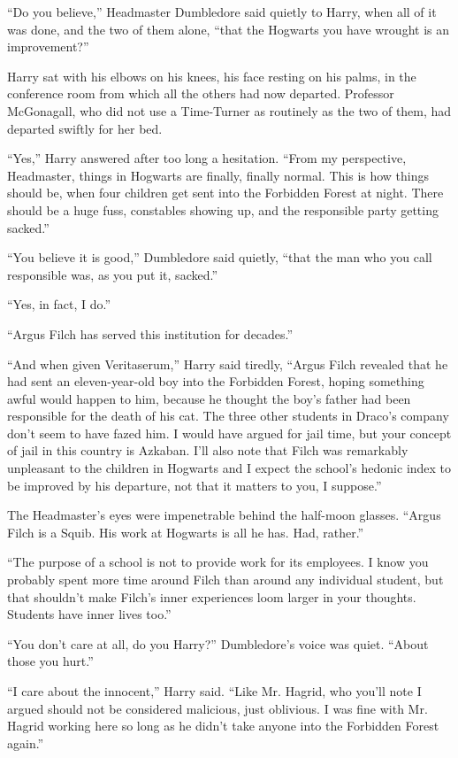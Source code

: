 ``Do you believe,'' Headmaster Dumbledore said quietly to Harry, when all of it was done, and the two of them alone, ``that the Hogwarts you have wrought is an improvement?''

Harry sat with his elbows on his knees, his face resting on his palms, in the conference room from which all the others had now departed. Professor McGonagall, who did not use a Time-Turner as routinely as the two of them, had departed swiftly for her bed.

``Yes,'' Harry answered after too long a hesitation. ``From my perspective, Headmaster, things in Hogwarts are finally, finally normal. This is how things should be, when four children get sent into the Forbidden Forest at night. There should be a huge fuss, constables showing up, and the responsible party getting sacked.''

``You believe it is good,'' Dumbledore said quietly, ``that the man who you call responsible was, as you put it, sacked.''

``Yes, in fact, I do.''

``Argus Filch has served this institution for decades.''

``And when given Veritaserum,'' Harry said tiredly, ``Argus Filch revealed that he had sent an eleven-year-old boy into the Forbidden Forest, hoping something awful would happen to him, because he thought the boy's father had been responsible for the death of his cat. The three other students in Draco's company don't seem to have fazed him. I would have argued for jail time, but your concept of jail in this country is Azkaban. I'll also note that Filch was remarkably unpleasant to the children in Hogwarts and I expect the school's hedonic index to be improved by his departure, not that it matters to you, I suppose.''

The Headmaster's eyes were impenetrable behind the half-moon glasses. ``Argus Filch is a Squib. His work at Hogwarts is all he has. Had, rather.''

``The purpose of a school is not to provide work for its employees. I know you probably spent more time around Filch than around any individual student, but that shouldn't make Filch's inner experiences loom larger in your thoughts. Students have inner lives too.''

``You don't care at all, do you Harry?'' Dumbledore's voice was quiet. ``About those you hurt.''

``I care about the innocent,'' Harry said. ``Like Mr. Hagrid, who you'll note I argued should not be considered malicious, just oblivious. I was fine with Mr. Hagrid working here so long as he didn't take anyone into the Forbidden Forest again.''

